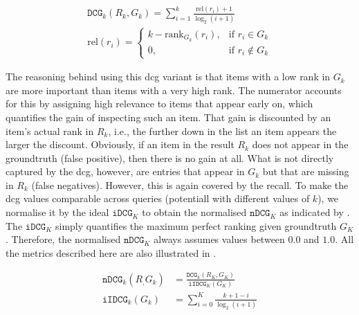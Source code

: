 \begin{eqnarray}
\label{equation:dcg}
\mathtt{DCG}_k (R_k, G_k)= \sum_{i = 1}^{k} \frac{\text{rel}(r_i) + 1}{\log_2(i + 1)} \\
\text{rel} (r_i) = 
    \begin{cases}
        k - \text{rank}_{G_k}(r_i), &  \text{if } r_i \in G_k \\
        0,                          &  \text{if } r_i \notin G_k
    \end{cases}
\end{eqnarray}

The reasoning behind using this \acrshort{dcg} variant is that items with a low rank in $G_k$ are more important than items with a very high rank. The numerator accounts for this by assigning high relevance to items that appear early on, which quantifies the gain of inspecting such an item. That gain is discounted by an item's actual rank in $R_k$, i.e., the further down in the list an item appears the larger the discount. Obviously, if an item in the result $R_k$ does not appear in the groundtruth (false positive), then there is no gain at all. What is not directly captured by the \acrshort{dcg}, however, are entries that appear in $G_k$ but that are missing in $R_k$ (false negatives). However, this is again covered by the recall. To make the \acrshort{dcg} values comparable across queries (potentiall with different values of $k$), we normalise it by the ideal $\mathtt{iDCG}_K$ to obtain the normalised $\mathtt{nDCG}_K$ as indicated by . The $\mathtt{iDCG}_K$ simply quantifies the maximum perfect ranking given groundtruth $G_K$. Therefore, the normalised $\mathtt{nDCG}_K$ always assumes values between $0.0$ and $1.0$. All the metrics described here are also illustrated in .

\begin{align}
    \label{equation:ndcg}
    \mathtt{nDCG}_k(R_, G_k) &= \frac{\mathtt{DCG}_k(R_K, G_K)}{\mathtt{iIDCG}_K(G_K)} \\
    \mathtt{iIDCG}_k(G_k) &= \sum_{i = 0}^{K} \frac{k + 1 - i}{\log_2(i + 1)}
\end{align}

